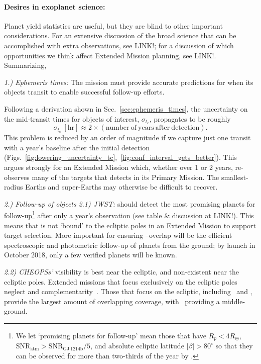 \paragraph{Desires in exoplanet science:}
Planet yield statistics are useful, but they are blind to other important considerations. For an extensive discussion of the broad science that can be accomplished with extra \tess observations, see LINK!; for a discussion of which opportunities we think affect Extended Mission planning, see LINK!. Summarizing,

\textit{1.) Ephemeris times:}
The \tess mission must provide accurate predictions for when its objects transit to enable successful follow-up efforts.

Following a derivation shown in Sec.~\ref{sec:ephemeris_times},
the uncertainty on the mid-transit times for \tess objects of interest, $\sigma_{t_c}$, propagates to be roughly
$$\sigma_{t_c}\ \mathrm{[hr]} \approx 2\times\left(\mathrm{number\ of\ years\ after\ detection}\right). $$
This problem is reduced by an order of magnitude if we capture just one transit with a year's baseline after the initial detection (Figs.~\ref{fig:lowering_uncertainty_tc},~\ref{fig:conf_interval_gets_better}).
This argues strongly for an Extended Mission which, whether over 1 or 2 years, re-observes many of the targets that \tess detects in its Primary Mission. 
The smallest-radius Earths and super-Earths may otherwise be difficult to recover.

\textit{2.) Follow-up of \tess objects}\newline
\textit{2.1) JWST:} \tess should detect the most promising planets for \jwst follow-up\footnote{We let `promising planets for \jwst follow-up' mean those that have $R_p<4R_\oplus$, $\mathrm{SNR_{atm}} > \mathrm{SNR_{GJ\ 1214b}}/5$, and absolute ecliptic latitude $|\beta|>80^\circ$ so that they can be observed for more than two-thirds of the year by \jwst\!.} after only a year's observation (see table \& discussion at LINK!).
This means that \tess is not `bound' to the ecliptic poles in an Extended Mission to support \jwsts target selection.
More important for ensuring \jwst\!--\tess overlap will be the efficient spectroscopic and photometric follow-up of \tesss planets from the ground; by \jwsts launch in October 2018, only a few verified \tess planets will be known.

\textit{2.2) CHEOPSs'} visibility is best near the ecliptic, and non-existent near the ecliptic poles.
Extended missions that focus exclusively on the ecliptic poles neglect \tess and \cheopss complementarity~\citep{berta_cheops_2016}.
Those that focus on the ecliptic, including \elong\ and \eshort, provide the largest amount of overlapping coverage, with \nhemi\ providing a middle-ground.


